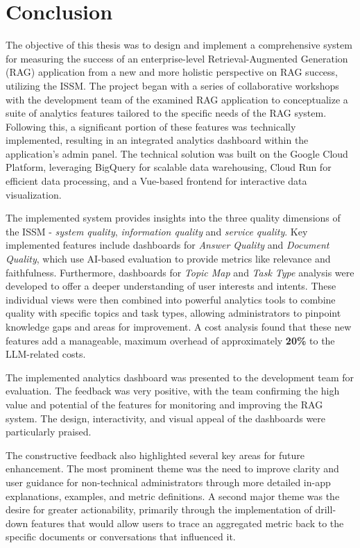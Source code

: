 \documentclass[
	english,
	ruledheaders=section,%
	class=report,%
	thesis={type=bachelor},%
	accentcolor=1b,%
	custommargins=true,%
	marginpar=false,%
	parskip=half-,%
	fontsize=11pt,%
	DIV=14,
]{tudapub}
\begin{document}
\chapter{Conclusion}
The objective of this thesis was to design and implement a comprehensive system for measuring the success of an enterprise-level Retrieval-Augmented Generation (RAG) application from a new and more holistic perspective on RAG success, utilizing the ISSM. The project began with a series of collaborative workshops with the development team of the examined RAG application to conceptualize a suite of analytics features tailored to the specific needs of the RAG system. Following this, a significant portion of these features was technically implemented, resulting in an integrated analytics dashboard within the application's admin panel. The technical solution was built on the Google Cloud Platform, leveraging BigQuery for scalable data warehousing, Cloud Run for efficient data processing, and a Vue-based frontend for interactive data visualization.

The implemented system provides insights into the three quality dimensions of the ISSM - \textit{system quality}, \textit{information quality} and \textit{service quality}. Key implemented features include dashboards for \textit{Answer Quality} and \textit{Document Quality}, which use AI-based evaluation to provide metrics like relevance and faithfulness. Furthermore, dashboards for \textit{Topic Map} and \textit{Task Type} analysis were developed to offer a deeper understanding of user interests and intents. These individual views were then combined into powerful analytics tools to combine quality with specific topics and task types, allowing administrators to pinpoint knowledge gaps and areas for improvement. A cost analysis found that these new features add a manageable, maximum overhead of approximately \textbf{20\%} to the LLM-related costs.

The implemented analytics dashboard was presented to the development team for evaluation. The feedback was very positive, with the team confirming the high value and potential of the features for monitoring and improving the RAG system. The design, interactivity, and visual appeal of the dashboards were particularly praised.

The constructive feedback also highlighted several key areas for future enhancement. The most prominent theme was the need to improve clarity and user guidance for non-technical administrators through more detailed in-app explanations, examples, and metric definitions. A second major theme was the desire for greater actionability, primarily through the implementation of drill-down features that would allow users to trace an aggregated metric back to the specific documents or conversations that influenced it.
\end{document}
